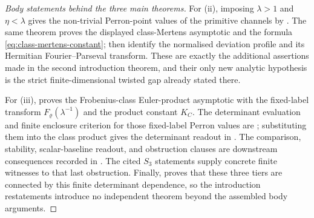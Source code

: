 \documentclass[11pt,a4paper]{amsart}
\theoremstyle{plain}
\theoremstyle{definition}
\theoremstyle{remark}
\begin{document}
\begin{proof}[Body statements behind the three main theorems]
  For \textup{(ii)}, imposing \(\lambda>1\) and \(\eta<\lambda\) gives the
  non-trivial Perron-point values of the primitive channels by
  .  The same theorem proves the displayed
  class-Mertens asymptotic and the formula
  \eqref{eq:class-mertens-constant};
   then identify
  the normalised deviation profile and its Hermitian Fourier--Parseval
  transform.  These are exactly the additional assertions made in the second
  introduction theorem, and their only new analytic hypothesis is the strict
  finite-dimensional twisted gap already stated there.

  For \textup{(iii)},  proves the
  Frobenius-class Euler-product asymptotic with the fixed-label transform
  \(F_\varrho(\lambda^{-1})\) and the product constant \(K_C\).  The determinant
  evaluation and finite enclosure criterion for those fixed-label Perron values are
  ;
  substituting them into the class product gives the determinant readout in
  .
  The comparison, stability, scalar-baseline readout, and obstruction clauses
  are downstream consequences recorded in
  .
  The cited \(S_3\) statements supply concrete finite witnesses to that last
  obstruction.  Finally,
   proves that these three
  tiers are connected by this finite determinant dependence, so the
  introduction restatements introduce no independent theorem beyond the
  assembled body arguments.
\end{proof}
\end{document}
